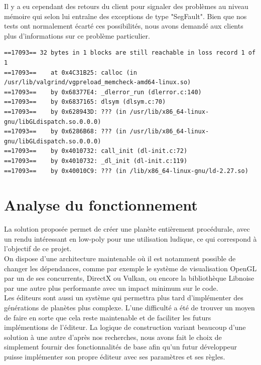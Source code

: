 \documentclass[a4paper]{article}
\begin{document}
Il y a eu cependant des retours du client pour signaler des problèmes au niveau mémoire qui selon lui entraîne des exceptions de type "SegFault". Bien que nos tests ont normalement écarté ces possibilités, nous avons demandé aux clients plus d'informations sur ce problème particulier.

\newpage
\begin{lstlisting}[caption= Extrait de la commande valgrind \\ 
\label{exmem}
\texttt{valgrind --leak-check=full --show-leak-kinds=all --log-file="../tests\_result/valgrind\_tests.txt" ./unit\_tests}]
==17093== 32 bytes in 1 blocks are still reachable in loss record 1 of 1
==17093==    at 0x4C31B25: calloc (in /usr/lib/valgrind/vgpreload_memcheck-amd64-linux.so)
==17093==    by 0x68377E4: _dlerror_run (dlerror.c:140)
==17093==    by 0x6837165: dlsym (dlsym.c:70)
==17093==    by 0x628943D: ??? (in /usr/lib/x86_64-linux-gnu/libGLdispatch.so.0.0.0)
==17093==    by 0x6286B68: ??? (in /usr/lib/x86_64-linux-gnu/libGLdispatch.so.0.0.0)
==17093==    by 0x4010732: call_init (dl-init.c:72)
==17093==    by 0x4010732: _dl_init (dl-init.c:119)
==17093==    by 0x40010C9: ??? (in /lib/x86_64-linux-gnu/ld-2.27.so)
\end{lstlisting}

\newpage
\section{Analyse du fonctionnement}

La solution proposée permet de créer une planète entièrement procédurale, avec un rendu intéressant en low-poly pour une utilisation ludique, ce qui correspond à l'objectif de ce projet.\\

On dispose d'une architecture maintenable où il est notamment possible de changer les dépendances, comme par exemple le système de visualisation OpenGL par un de ses concurrents, DirectX ou Vulkan, ou encore la bibliothèque Libnoise par une autre plus performante avec un impact minimum sur le code.\\

Les éditeurs sont aussi un système qui permettra plus tard d'implémenter des générations de planètes plus complexe. L'une difficulté a été de trouver un moyen de faire en sorte que cela reste maintenable et de faciliter les futurs implémentions de l'éditeur. La logique de construction variant beaucoup d'une solution à une autre d'après nos recherches, nous avons fait le choix de simplement fournir des fonctionnalités de base afin qu'un futur développeur puisse implémenter son propre éditeur avec ses paramètres et ses règles.\\
\end{document}
